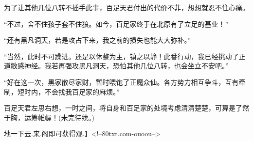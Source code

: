 \begin{this_body}
为了让其他几位八转不插手此事，百足天君付出的代价不菲，想想就忍不住心痛。

“不过，舍不住孩子套不住狼。如今，百足家终于在北原有了立足的基业！”

“还有黑凡洞天，若是攻占下来，我之前的损失也能大大弥补。”

“当然，此时不可躁进。还是以休整为主，镇之以静！此番行动，我已经挑动了正道敏感神经。我若再强攻黑凡洞天，恐怕其他几位八转，也会坐立不安吧。”

“好在这一次，黑家散尽家财，暂时喂饱了正魔众仙。各方势力相互争斗，互有牵制，短时内，不会找我百足家的麻烦。”

百足天君左思右想，一时之间，将自身和百足家的处境考虑清清楚楚，可算是了然于胸，运筹帷幄！(未完待续。)

地一下云.来.阁即可获得观.】<!--80txt.com-ouoou-->

\end{this_body}

